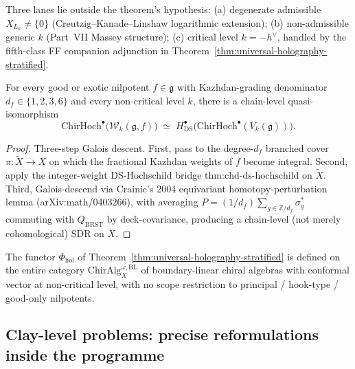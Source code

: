 \documentclass[11pt]{article}
\begin{document}
\begin{remark}[Residuals]
Three lanes lie outside the theorem's hypothesis: (a) degenerate
admissible $X_{L_k} \ne \{0\}$ (Creutzig--Kanade--Linshaw logarithmic
extension); (b) non-admissible generic $k$ (Part~VII Massey structure);
(c) critical level $k = -h^{\vee}$, handled by the fifth-class FF
companion adjunction in
Theorem~\ref{thm:universal-holography-stratified}.
\end{remark}

\begin{theorem}
\label{thm:ds-hoch-exotic}
For every good or exotic nilpotent $f \in \mathfrak{g}$ with
Kazhdan-grading denominator $d_f \in \{1, 2, 3, 6\}$ and every
non-critical level $k$, there is a chain-level quasi-isomorphism
\[
  \mathrm{ChirHoch}^{\bullet}\bigl(\mathcal{W}_k(\mathfrak{g}, f)\bigr)
  \;\simeq\;
  H^{\bullet}_{\mathrm{DS}}\bigl(\mathrm{ChirHoch}^{\bullet}(V_k(\mathfrak{g}))\bigr).
\]
\end{theorem}

\begin{proof}
Three-step Galois descent. First, pass to the degree-$d_f$ branched
cover $\pi : \widetilde{X} \to X$ on which the fractional Kazhdan
weights of $f$ become integral. Second, apply the integer-weight
DS-Hochschild bridge $\mathrm{thm}\text{:}\mathrm{chd\text{-}ds\text{-}hochschild}$
on $\widetilde{X}$. Third, Galois-descend via Crainic's 2004
equivariant homotopy-perturbation lemma (arXiv:math/0403266), with
averaging
$P = (1/d_f) \sum_{g \in \mathbb{Z}/d_f} \sigma_g^*$
commuting with $Q_{\mathrm{BRST}}$ by deck-covariance, producing a
chain-level (not merely cohomological) SDR on $X$.
\end{proof}

\begin{corollary}
\label{cor:universal-holography-full-domain}
The functor $\Phi_{\mathrm{hol}}$ of
Theorem~\ref{thm:universal-holography-stratified} is defined on the
entire category $\mathrm{ChirAlg}^{\omega, \mathrm{BL}}_X$ of
boundary-linear chiral algebras with conformal vector at non-critical
level, with no scope restriction to principal / hook-type / good-only
nilpotents.
\end{corollary}

\subsection{Clay-level problems: precise reformulations inside the programme}
\label{subsec:clay-precise-reformulations}
\end{document}
